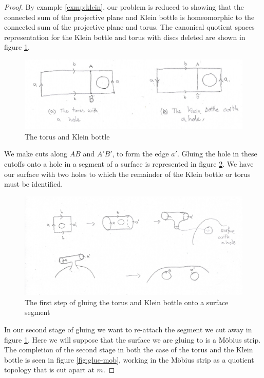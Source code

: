 \begin{proof}
  By example \ref{exmp:klein}, our problem is reduced to showing that
  the connected sum of the projective plane and Klein bottle is
  homeomorphic to the connected sum of the projective plane and
  torus. The canonical quotient spaces representation for the Klein
  bottle and torus with discs deleted are shown in figure
  \ref{fig:tor-klein}.
  \begin{figure}[htbp]
    \centering
    \includegraphics[width=13.5cm]{torklein.png}
    \caption{The torus and Klein bottle}
    \label{fig:tor-klein}
  \end{figure}

  We make cuts along $AB$ and $A'B'$, to form the edge $a'$. Gluing
  the hole in these cutoffs onto a hole in a segment of a surface is
  represented in figure \ref{fig:glue-S}. We have our surface with two
  holes to which the remainder of the Klein bottle or torus must be
  identified.

  \begin{figure}[htbp]
    \centering
    \includegraphics[width=13.5cm]{glues.png}
    \caption{The first step of gluing the torus and Klein bottle onto
      a surface segment}
    \label{fig:glue-S}
  \end{figure}

  In our second stage of gluing we want to re-attach the segment we cut
  away in figure \ref{fig:tor-klein}. Here we will suppose that the
  surface we are gluing to is a M\"obius strip. The completion of the
  second stage in both the case of the torus and the Klein bottle is
  seen in figure \ref{fig:glue-mob}, working in the M\"obius strip as a
  quotient topology that is cut apart at $m$.
  

\end{proof}
